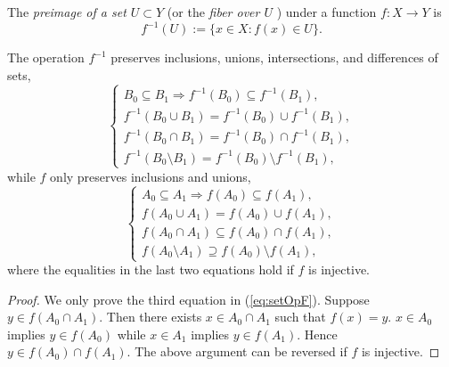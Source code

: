 \begin{defn}
  \label{def:preimage}
  The \emph{preimage of a set $U\subset Y$}
  (or the \emph{fiber over $U$ })
  under a function $f: X\rightarrow Y$ is 
   \begin{equation}
     \label{eq:preimage}
     f^{-1}(U) := \{ x\in X: f(x)\in U\}.
   \end{equation}
\end{defn}

\begin{lem}
  \label{lem:setOpPreservation}
  The operation $f^{-1}$ preserves inclusions,
  unions, intersections, and differences of sets, 
  \begin{equation}
    \label{eq:setOpFpre}
    \left\{
      \begin{array}{l}
        B_0\subseteq B_1 \Rightarrow f^{-1}(B_0)\subseteq f^{-1}(B_1),
        \\
        f^{-1}(B_0\cup B_1) = f^{-1}(B_0) \cup f^{-1}(B_1),
        \\
        f^{-1}(B_0\cap B_1) = f^{-1}(B_0) \cap f^{-1}(B_1),
        \\
        f^{-1}(B_0\setminus B_1) = f^{-1}(B_0) \setminus f^{-1}(B_1), 
      \end{array}
    \right .
  \end{equation}
  while $f$ only preserves inclusions and unions, 
  \begin{equation}
    \label{eq:setOpF}
    \left\{
      \begin{array}{l}
        A_0\subseteq A_1 \Rightarrow f(A_0)\subseteq f(A_1),
        \\
        f(A_0\cup A_1) = f(A_0) \cup f(A_1),
        \\
        f(A_0\cap A_1) \subseteq f(A_0) \cap f(A_1),
        \\
        f(A_0\setminus A_1) \supseteq f(A_0) \setminus f(A_1),
      \end{array}
    \right .
  \end{equation}
  where the equalities in the last two equations hold
  if $f$ is injective.
\end{lem}
\begin{proof}
  We only prove the third equation in (\ref{eq:setOpF}).
  Suppose $y\in f(A_0\cap A_1)$.
  Then there exists $x\in A_0\cap A_1$ such that $f(x)=y$.
   $x\in A_0$ implies $y\in f(A_0)$
   while $x\in A_1$ implies $y\in f(A_1)$.
  Hence $y\in f(A_0)\cap f(A_1)$.
  The above argument can be reversed if $f$ is injective.
\end{proof}

